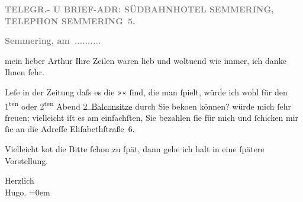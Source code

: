 \pstart
           \centering{}\textcolor{gray}{\textbf{TELEGR.- U BRIEF-ADR: SÜDBAHNHOTEL SEMMERING, TELEPHON SEMMERING 5.}}\pend
           
\pstart
           \raggedleft{}\textcolor{gray}{\textbf{Semmering, am ..........}}\pend
           
\pstart{}mein lieber Arthur\pend\vspace{0.5em}
\pstart
           Ihre Zeilen waren lieb und woltuend wie immer, ich danke Ihnen{ }ſehr.\pend
           
\pstart
           Leſe in der Zeitung daſs es die »\label{K_L02053-1v}\label{K_L02053-1}«{ }ſind, die man{ }ſpielt, würde ich wohl für den 1\textsuperscript{ten}{ }{\pb}oder 2\textsuperscript{ten} Abend \uline{2 Balconsitze} durch Sie beko{\geminationm}en können? würde mich{ }ſehr freuen; vielleicht iſt es am
               einfachſten, Sie bezahlen{ }ſie für mich und{ }ſchicken mir{ }ſie an die Adreſſe Eliſabethſtraße 6.\pend
           
\pstart
           Vielleicht ko{\geminationm}t die Bitte{ }ſchon zu{ }ſpät, dann gehe ich
               halt in eine{ }ſpätere Vorstellung.\pend
           
\pstart
           Herzlich{\\[\baselineskip]}\spacefill\mbox{Hugo.}\pend
           \leftskip=0em{}\endnumbering{}  \newcommand{\dateiname}{L02053}\newcommand{\titel}{Hugo von Hofmannsthal an Arthur Schnitzler, [7. 2. 1912]}\newcommand{\editorInnen}{Martin Anton Müller und Gerd-Hermann Susen}
